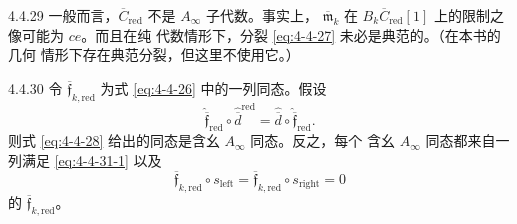 \begin{remark}{4.4.29}\label{rem:4-4-29}
一般而言，$\overline C_{\mathrm{red}}$ 不是 $A_\infty$ 子代数。事实上，
$\overline{\mathfrak m}_k$ 在
$B_k\overline C_{\mathrm{red}}[1]$ 上的限制之像可能为 $ce$。而且在纯
代数情形下，分裂 \eqref{eq:4-4-27} 未必是典范的。（在本书的几何
情形下存在典范分裂，但这里不使用它。）
\end{remark}

\begin{lemma}{4.4.30}\label{lem:4-4-30}
令 $\overline{\mathfrak f}_{k,\mathrm{red}}$ 为式
\eqref{eq:4-4-26} 中的一列同态。假设
\begin{equation}
 \widehat{\overline{\mathfrak f}}_{\mathrm{red}}
 \circ\widehat{\overline d}^{\mathrm{red}}
 =\widehat{\overline d}
 \circ\widehat{\overline{\mathfrak f}}_{\mathrm{red}}.
\tag{4.4.31.1}\label{eq:4-4-31-1}
\end{equation}
则式 \eqref{eq:4-4-28} 给出的同态是含幺 $A_\infty$ 同态。反之，每个
含幺 $A_\infty$ 同态都来自一列满足 \eqref{eq:4-4-31-1} 以及
\begin{equation}
 \overline{\mathfrak f}_{k,\mathrm{red}}\circ s_{\mathrm{left}}
 =\overline{\mathfrak f}_{k,\mathrm{red}}\circ s_{\mathrm{right}}=0
\tag{4.4.31.2}\label{eq:4-4-31-2}
\end{equation}
的 $\overline{\mathfrak f}_{k,\mathrm{red}}$。
\end{lemma}

